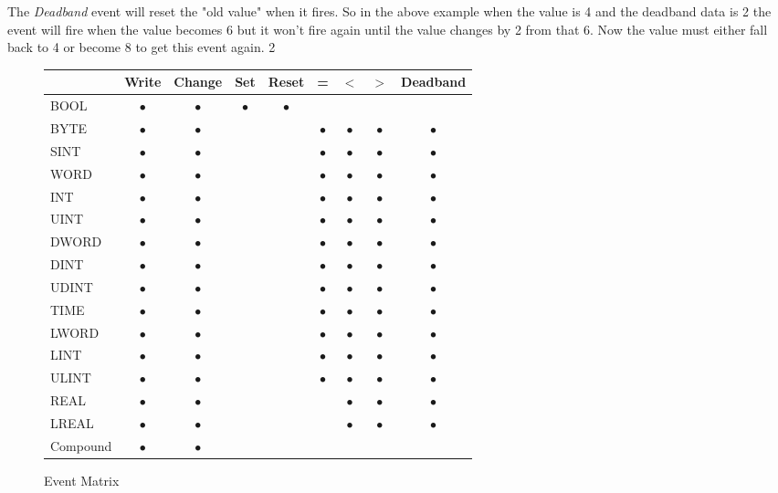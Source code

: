 The \textit{Deadband} event will reset the "old value" when it fires.  So in the above example when the value is 4 and the deadband data is 2 the event will fire when the value becomes 6 but it won't fire again until the value changes by 2 from that 6.  Now the value must either fall back to 4 or become 8 to get this event again.
2
\begin{figure}[h]
\centering
\begin{tabular}{|l|c|c|c|c|c|c|c|c|}
\hline   & Write & Change & Set & Reset & = & $<$ & $>$ & Deadband \\
\hline  BOOL & $\bullet$ & $\bullet$ & $\bullet$ & $\bullet$ &  &  &  &  \\
\hline  BYTE & $\bullet$ & $\bullet$ &  &  & $\bullet$ & $\bullet$ & $\bullet$ & $\bullet$ \\
\hline  SINT & $\bullet$ & $\bullet$ &  &  & $\bullet$ & $\bullet$ & $\bullet$ &$\bullet$  \\
\hline  WORD & $\bullet$ & $\bullet$ &  &  & $\bullet$ & $\bullet$ & $\bullet$ & $\bullet$ \\
\hline  INT & $\bullet$ & $\bullet$ &  &  & $\bullet$ & $\bullet$ & $\bullet$ & $\bullet$ \\
\hline  UINT & $\bullet$ & $\bullet$ &  &  & $\bullet$ & $\bullet$ & $\bullet$ & $\bullet$ \\
\hline  DWORD & $\bullet$ & $\bullet$ &  &  & $\bullet$ & $\bullet$ & $\bullet$ & $\bullet$ \\
\hline  DINT & $\bullet$ & $\bullet$ &  &  & $\bullet$ & $\bullet$ & $\bullet$ & $\bullet$ \\
\hline  UDINT & $\bullet$ & $\bullet$ &  &  & $\bullet$ & $\bullet$ & $\bullet$ & $\bullet$ \\
\hline  TIME & $\bullet$ & $\bullet$ &  &  & $\bullet$ & $\bullet$ & $\bullet$ & $\bullet$ \\
\hline  LWORD & $\bullet$ & $\bullet$ &  &  & $\bullet$ & $\bullet$ & $\bullet$ & $\bullet$ \\
\hline  LINT & $\bullet$ & $\bullet$ &  &  & $\bullet$ & $\bullet$ & $\bullet$ & $\bullet$ \\
\hline  ULINT & $\bullet$ & $\bullet$ &  &  & $\bullet$ & $\bullet$ & $\bullet$ & $\bullet$ \\
\hline  REAL & $\bullet$ & $\bullet$ &  &  &  & $\bullet$ & $\bullet$ & $\bullet$ \\
\hline  LREAL & $\bullet$ & $\bullet$ &  &  &  & $\bullet$ & $\bullet$ & $\bullet$ \\
\hline  Compound & $\bullet$ & $\bullet$ &  &  &  &  &  &  \\
\hline
\end{tabular}
\caption{\label{Event Matrix}Event Matrix}
\end{figure}

